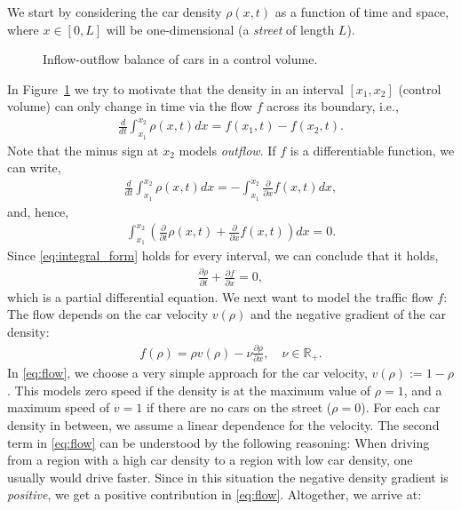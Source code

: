 \documentclass[a4paper,10pt]{article}
\begin{document}
We start by considering the car density $\rho(x,t)$ as a function of time and space, where $x\in[0,L]$ will be one-dimensional (a \textit{street} of length $L$).
\begin{figure}[ht]
\centering
{}
\caption{Inflow-outflow balance of cars in a control volume.}\label{car_flow}
\end{figure}
In \mbox{Figure \ref{car_flow}} we try to motivate that the density in an interval $[x_1,x_2]$ (control volume) can only change in time via the flow $f$ across its boundary, i.e.,
\begin{align*}
 \frac{d}{dt} \int_{x_1}^{x_2} \rho(x,t) dx =  f(x_1,t) - f(x_2,t).
\end{align*}
Note that the minus sign at $x_2$ models \textit{outflow}. If $f$ is a differentiable function, we can write,
\begin{align*}
 \frac{d}{dt} \int_{x_1}^{x_2} \rho(x,t) dx =  -\int_{x_1}^{x_2} \frac{\partial}{\partial x} f(x,t) dx,
\end{align*}
and, hence,
\begin{align}
\label{eq:integral_form}
 \int_{x_1}^{x_2} \left( \frac{\partial}{\partial t}\rho(x,t) + \frac{\partial}{\partial x} f(x,t) \right) dx = 0.
\end{align}
Since \eqref{eq:integral_form} holds for every interval, we can conclude that it holds, 
\begin{align*}
 \frac{\partial \rho}{\partial t} + \frac{\partial f}{\partial x}  = 0,
\end{align*}
which is a partial differential equation. We next want to model the traffic flow $f$: The flow depends on the car velocity $v(\rho)$ and the negative gradient of the car density:
\begin{align}
\label{eq:flow}
 f(\rho) = \rho v(\rho) - \nu \frac{\partial \rho}{\partial x}, \quad \nu \in \mathbb{R}_+.
\end{align}
In \eqref{eq:flow}, we choose a very simple approach for the car velocity, $v(\rho) := 1 - \rho$. This models zero speed if the density is at the maximum value of $\rho = 1$, and a maximum speed of $v = 1$ if there are no cars on the street ($\rho = 0$). For each car density in between, we assume a linear dependence for the velocity. The second term in \eqref{eq:flow} can be understood by the following reasoning: When driving from a region with a high car density to a region with low car density, one usually would drive faster. Since in this situation the negative density gradient is \textit{positive}, we get a positive contribution in \eqref{eq:flow}. Altogether, we arrive at:
\end{document}

